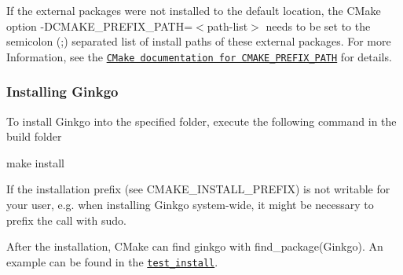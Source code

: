 If the external packages were not installed to the default location, the C\+Make option {\ttfamily -\/\+D\+C\+M\+A\+K\+E\+\_\+\+P\+R\+E\+F\+I\+X\+\_\+\+P\+A\+TH=$<$path-\/list$>$} needs to be set to the semicolon ({\ttfamily ;}) separated list of install paths of these external packages. For more Information, see the \href{https://cmake.org/cmake/help/v3.9/variable/CMAKE_PREFIX_PATH.html}{\tt C\+Make documentation for C\+M\+A\+K\+E\+\_\+\+P\+R\+E\+F\+I\+X\+\_\+\+P\+A\+TH} for details.

\subsubsection*{Installing Ginkgo}

To install Ginkgo into the specified folder, execute the following command in the build folder


\begin{DoxyCode}
make install
\end{DoxyCode}


If the installation prefix (see {\ttfamily C\+M\+A\+K\+E\+\_\+\+I\+N\+S\+T\+A\+L\+L\+\_\+\+P\+R\+E\+F\+IX}) is not writable for your user, e.\+g. when installing Ginkgo system-\/wide, it might be necessary to prefix the call with {\ttfamily sudo}.

After the installation, C\+Make can find ginkgo with {\ttfamily find\+\_\+package(\+Ginkgo)}. An example can be found in the \href{test_install/CMakeLists.txt}{\tt {\ttfamily test\+\_\+install}}. 